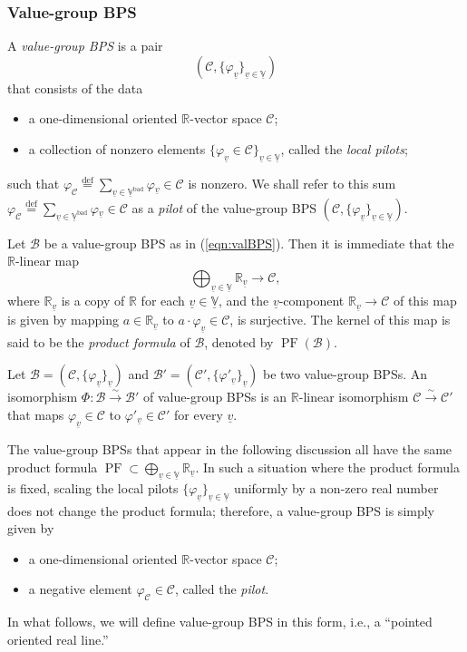 \documentclass[12pt, reqno, a4paper]{amsart}
\def\udl#1{\underline{#1}} %
\def\longto{\longrightarrow}
\def\eqdef{\stackrel{\textrm{def}}{=}} %
\def\simto{\stackrel{\sim}{\rightarrow}} %
\def\bR{\mathbb{R}} %
\def\bV{\mathbb{V}}
\def\cB{{\mathcal{B}}}
\def\cC{{\mathcal{C}}}
\def\uV{\udl{\bV}} %
\def\uv{\udl{v}} %
\def\bad{\mathrm{bad}}
\DeclareMathOperator{\PF}{PF}
\begin{document}
\subsubsection{Value-group BPS}\label{subsub:valBPS}

\begin{dfn}\label{dfn:valBPS}
A \emph{value-group BPS} is a pair 
\begin{equation}\label{eqn:valBPS}
(\cC,\{\varphi_{\uv}\}_{\uv\in\uV})
\end{equation}
that consists of the data 
\begin{itemize}
\item[$\bullet$] a one-dimensional oriented $\bR$-vector space $\cC$; 
\item[$\bullet$] a collection of nonzero elements $\{\varphi_{\uv}\in \cC\}_{\uv\in\uV}$, called the \emph{local pilots}; 
\end{itemize}
such that $\varphi_{\cC} \eqdef \sum_{\uv\in\uV^{\bad}}\varphi{}_{\uv} \in \cC$ is nonzero.  
We shall refer to this sum $\varphi_{\cC} \eqdef \sum_{\uv\in\uV^{\bad}}\varphi{}_{\uv} \in \cC$ as a \emph{pilot} of the value-group BPS $(\cC,\{\varphi_{\uv}\}_{\uv\in\uV})$.  
\end{dfn}

Let $\cB$ be a value-group BPS as in (\ref{eqn:valBPS}).
Then it is immediate that the $\bR$-linear map
\begin{equation}\label{eqn:productFormula}
\bigoplus_{\uv\in\uV}\bR_{\uv}\longto\cC,
\end{equation}
where $\bR_{\uv}$ is a copy of $\bR$ for each $\uv\in\uV$, and the $\uv$-component $\bR_{\uv} \to \cC$ of this map is given by mapping $a \in \bR_{\uv}$ to $a\cdot \varphi_{\uv} \in \cC$, is surjective.  The kernel of this map is said to be the \emph{product formula} of $\cB$, denoted by $\PF(\cB)$.

\begin{dfn}\label{dfn:isoValBPSs}
Let $\cB=(\cC,\{\varphi_{\uv}\}_{\uv})$ and $\cB'=(\cC',\{\varphi'_{\uv}\}_{\uv})$ be two value-group BPSs.
An isomorphism $\Phi\colon\cB\simto\cB'$ of value-group BPSs is an $\bR$-linear isomorphism $
\cC\simto\cC'$ that maps $\varphi_{\uv} \in \cC$ to $\varphi'_{\uv} \in \cC'$ for every $\uv$.  
\end{dfn}

\begin{rem}\label{rem:definingValueGroupBPS}
The value-group BPSs that appear in the following discussion all have the same product formula $\PF\subset\bigoplus\limits_{\uv\in\uV}\bR_{\uv}$. In such a situation where the product formula is fixed, scaling the local pilots $\{\varphi_{\uv}\}_{\uv\in\uV}$ uniformly by a non-zero real number does not change the product formula; therefore, a value-group BPS is simply given by 
\begin{itemize}
\item a one-dimensional oriented $\bR$-vector space $\cC$;
\item a negative element $\varphi_{\cC}\in\cC$, called the \emph{pilot}.
\end{itemize}
In what follows, we will define value-group BPS in this form, i.e., a ``pointed oriented real line.''
\end{rem}
\end{document}
